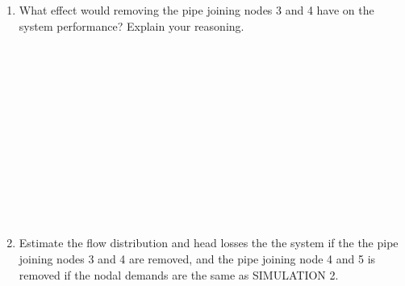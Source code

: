 \documentclass[11pt]{article}
\begin{document}
\begin{enumerate}
\begin{enumerate}
\clearpage
\item What effect would removing the pipe joining nodes 3 and 4 have on the system performance?   Explain your reasoning.
\\
\\
\\
\\
\\
\\
\\
\\
\\
\\
\\
\\
\\
\item Estimate the flow distribution and head losses the the system if the the pipe joining nodes 3 and 4 are removed, and the pipe joining node 4 and 5 is removed if the nodal demands are the same as SIMULATION  2.
\end{enumerate} 

\begin{figure}[ht!] %
\centering


\end{figure}
\end{enumerate}
\end{document}
